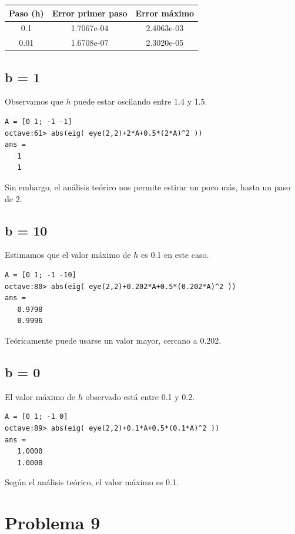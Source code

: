 \documentclass[a4paper,12pt]{article}
\begin{document}
\begin{table}[H]
\centering
\begin{tabular}{@{}ccc@{}}
\toprule
Paso (h) & Error primer paso & Error máximo \\
\midrule
0.1 & 1.7067e-04 & 2.4063e-03 \\
0.01 & 1.6708e-07 & 2.3020e-05 \\
\bottomrule
\end{tabular}
\end{table}

\subsection*{b = 1}
Observamos que \( h \) puede estar oscilando entre 1.4 y 1.5.

\begin{verbatim}
A = [0 1; -1 -1]
octave:61> abs(eig( eye(2,2)+2*A+0.5*(2*A)^2 ))
ans =
   1
   1
\end{verbatim}

Sin embargo, el análisis teórico nos permite estirar un poco más, hasta un paso de 2.

\subsection*{b = 10}
Estimamos que el valor máximo de \( h \) es 0.1 en este caso.

\begin{verbatim}
A = [0 1; -1 -10]
octave:80> abs(eig( eye(2,2)+0.202*A+0.5*(0.202*A)^2 ))
ans =
   0.9798
   0.9996
\end{verbatim}

Teóricamente puede usarse un valor mayor, cercano a 0.202.

\subsection*{b = 0}
El valor máximo de \( h \) observado está entre 0.1 y 0.2.

\begin{verbatim}
A = [0 1; -1 0]
octave:89> abs(eig( eye(2,2)+0.1*A+0.5*(0.1*A)^2 ))
ans =
   1.0000
   1.0000
\end{verbatim}

Según el análisis teórico, el valor máximo es 0.1.

\section*{Problema 9}
\end{document}
